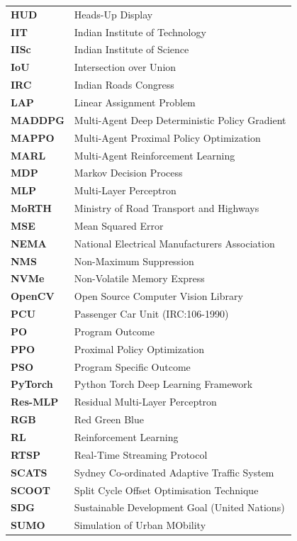 \documentclass[12pt,a4paper,oneside]{report}
\begin{document}
\begin{longtable}{p{3.0cm} p{11.5cm}}
\textbf{HUD} & Heads-Up Display \\
\textbf{IIT} & Indian Institute of Technology \\
\textbf{IISc} & Indian Institute of Science \\
\textbf{IoU} & Intersection over Union \\
\textbf{IRC} & Indian Roads Congress \\
\textbf{LAP} & Linear Assignment Problem \\
\textbf{MADDPG} & Multi-Agent Deep Deterministic Policy Gradient \\
\textbf{MAPPO} & Multi-Agent Proximal Policy Optimization \\
\textbf{MARL} & Multi-Agent Reinforcement Learning \\
\textbf{MDP} & Markov Decision Process \\
\textbf{MLP} & Multi-Layer Perceptron \\
\textbf{MoRTH} & Ministry of Road Transport and Highways \\
\textbf{MSE} & Mean Squared Error \\
\textbf{NEMA} & National Electrical Manufacturers Association \\
\textbf{NMS} & Non-Maximum Suppression \\
\textbf{NVMe} & Non-Volatile Memory Express \\
\textbf{OpenCV} & Open Source Computer Vision Library \\
\textbf{PCU} & Passenger Car Unit (IRC:106-1990) \\
\textbf{PO} & Program Outcome \\
\textbf{PPO} & Proximal Policy Optimization \\
\textbf{PSO} & Program Specific Outcome \\
\textbf{PyTorch} & Python Torch Deep Learning Framework \\
\textbf{Res-MLP} & Residual Multi-Layer Perceptron \\
\textbf{RGB} & Red Green Blue \\
\textbf{RL} & Reinforcement Learning \\
\textbf{RTSP} & Real-Time Streaming Protocol \\
\textbf{SCATS} & Sydney Co-ordinated Adaptive Traffic System \\
\textbf{SCOOT} & Split Cycle Offset Optimisation Technique \\
\textbf{SDG} & Sustainable Development Goal (United Nations) \\
\textbf{SUMO} & Simulation of Urban MObility \\

\end{longtable}
\end{document}
